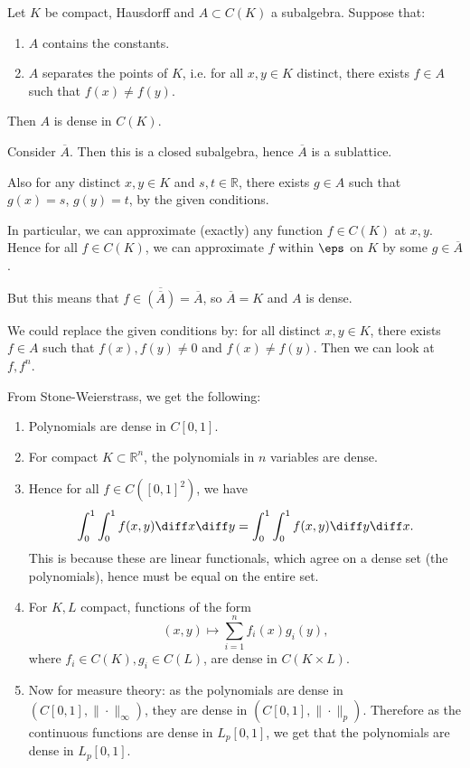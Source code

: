\documentclass[12pt]{article}
\begin{document}
\begin{theorem}
	Let $K$ be compact, Hausdorff and $A \subset C(K)$ a subalgebra. Suppose that:
	\begin{enumerate}[\normalfont(i)]
		\item $A$ contains the constants.
		\item $A$ separates the points of $K$, i.e. for all $x, y \in K$ distinct, there exists $f \in A$ such that $f(x) \neq f(y)$.
	\end{enumerate}
	Then $A$ is dense in $C(K)$.
\end{theorem}

\begin{proofbox}
	Consider $\overline{A}$. Then this is a closed subalgebra, hence $\overline{A}$ is a sublattice.

	Also for any distinct $x, y \in K$ and $s, t \in \mathbb{R}$, there exists $g \in A$ such that $g(x) = s$, $g(y) = t$, by the given conditions.

	In particular, we can approximate (exactly) any function $f \in C(K)$ at $x, y$. Hence for all $f \in C(K)$, we can approximate $f$ within $\eps$ on $K$ by some $g \in \overline{A}$. 

	But this means that $f \in \overline{(\overline{A})} = \overline{A}$, so $\overline{A} = K$ and $A$ is dense.
\end{proofbox}

\begin{remark}
	We could replace the given conditions by: for all distinct $x, y \in K$, there exists $f \in A$ such that $f(x), f(y) \neq 0$ and $f(x) \neq f(y)$. Then we can look at $f, f^{n}$.
\end{remark}

From Stone-Weierstrass, we get the following:
\begin{enumerate}
	\item Polynomials are dense in $C[0,1]$.
	\item For compact $K \subset \mathbb{R}^{n}$, the polynomials in $n$ variables are dense.
	\item Hence for all $f \in C([0,1]^2)$, we have
		\[
		\int_0^1 \int_0^1 f(x, y) \diff x \diff y = \int_0^1 \int_0^1 f(x, y) \diff y \diff x.
		\]
		This is because these are linear functionals, which agree on a dense set (the polynomials), hence must be equal on the entire set.
	\item For $K, L$ compact, functions of the form
		\[
			(x, y) \mapsto \sum_{i = 1}^{n} f_i(x) g_i(y),
		\]
		where $f_i \in C(K), g_i \in C(L)$, are dense in $C(K \times L)$.
	\item Now for measure theory: as the polynomials are dense in $(C[0,1], \|\cdot\|_\infty)$, they are dense in $(C[0,1], \|\cdot\|_p)$. Therefore as the continuous functions are dense in $L_p[0,1]$, we get that the polynomials are dense in $L_p[0,1]$.
\end{enumerate}
\end{document}
